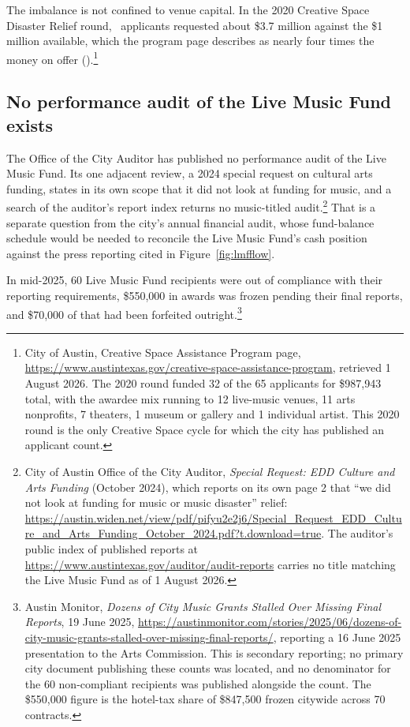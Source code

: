 The imbalance is not confined to venue capital. In the 2020 Creative
Space Disaster Relief round, \NCityCsapTwoZeroTwoZeroApplicants\
applicants requested about \$3.7 million against the \$1 million
available, which the program page describes as nearly four times the
money on offer
(\NCityCsapTwoZeroTwoZeroOversubVsAvailable).\footnote{City of Austin,
Creative Space Assistance Program page,
\url{https://www.austintexas.gov/creative-space-assistance-program},
retrieved 1 August 2026. The 2020 round funded 32 of the 65 applicants
for \$987{,}943 total, with the awardee mix running to 12 live-music
venues, 11 arts nonprofits, 7 theaters, 1 museum or gallery and 1
individual artist. This 2020 round is the only Creative Space cycle for
which the city has published an applicant count.}

\subsection{No performance audit of the Live Music Fund exists}

The Office of the City Auditor has published no performance audit of the
Live Music Fund. Its one adjacent review, a 2024 special request on
cultural arts funding, states in its own scope that it did not look at
funding for music, and a search of the auditor's report index returns no
music-titled audit.\footnote{City of Austin Office of the City Auditor,
\textit{Special Request: EDD Culture and Arts Funding} (October 2024),
which reports on its own page 2 that ``we did not look at funding for
music or music disaster'' relief:
\url{https://austin.widen.net/view/pdf/pifyu2e2j6/Special_Request_EDD_Culture_and_Arts_Funding_October_2024.pdf?t.download=true}.
The auditor's public index of published reports at
\url{https://www.austintexas.gov/auditor/audit-reports} carries no
title matching the Live Music Fund as of 1 August 2026.} That is a
separate question from the city's annual financial audit, whose
fund-balance schedule would be needed to reconcile the Live Music Fund's
cash position against the press reporting cited in
Figure~\ref{fig:lmfflow}.

In mid-2025, 60 Live Music Fund recipients were out of compliance with
their reporting requirements, \$550,000 in awards was frozen pending
their final reports, and \$70,000 of that had been forfeited
outright.\footnote{Austin Monitor, \textit{Dozens of City Music Grants
Stalled Over Missing Final Reports}, 19 June 2025,
\url{https://austinmonitor.com/stories/2025/06/dozens-of-city-music-grants-stalled-over-missing-final-reports/},
reporting a 16 June 2025 presentation to the Arts Commission. This is
secondary reporting; no primary city document publishing these counts
was located, and no denominator for the 60 non-compliant recipients was
published alongside the count. The \$550,000 figure is the hotel-tax
share of \$847,500 frozen citywide across 70 contracts.}

